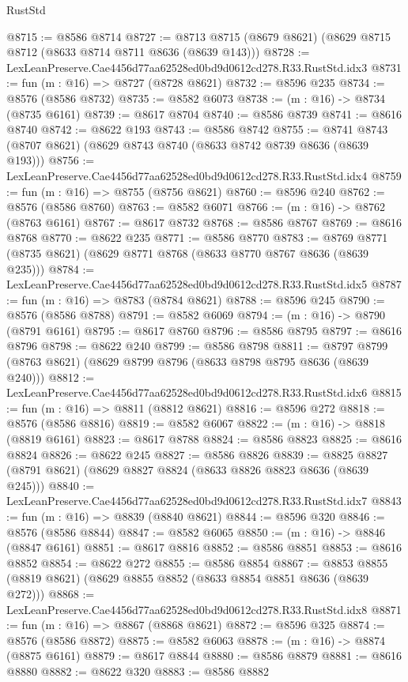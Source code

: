 \begin{lexlean}{RustStd}
\begin{coremodule}
@8715 := @8586 @8714
@8727 := @8713 @8715 (@8679 @8621) (@8629 @8715 @8712 (@8633 @8714 @8711 @8636 (@8639 @143)))
@8728 := LexLeanPreserve.Cae4456d77aa62528ed0bd9d0612cd278.R33.RustStd.idx3
@8731 := fun (m : @16) => @8727 (@8728 @8621)
@8732 := @8596 @235
@8734 := @8576 (@8586 @8732)
@8735 := @8582 @6073
@8738 := (m : @16) -> @8734 (@8735 @6161)
@8739 := @8617 @8704
@8740 := @8586 @8739
@8741 := @8616 @8740
@8742 := @8622 @193
@8743 := @8586 @8742
@8755 := @8741 @8743 (@8707 @8621) (@8629 @8743 @8740 (@8633 @8742 @8739 @8636 (@8639 @193)))
@8756 := LexLeanPreserve.Cae4456d77aa62528ed0bd9d0612cd278.R33.RustStd.idx4
@8759 := fun (m : @16) => @8755 (@8756 @8621)
@8760 := @8596 @240
@8762 := @8576 (@8586 @8760)
@8763 := @8582 @6071
@8766 := (m : @16) -> @8762 (@8763 @6161)
@8767 := @8617 @8732
@8768 := @8586 @8767
@8769 := @8616 @8768
@8770 := @8622 @235
@8771 := @8586 @8770
@8783 := @8769 @8771 (@8735 @8621) (@8629 @8771 @8768 (@8633 @8770 @8767 @8636 (@8639 @235)))
@8784 := LexLeanPreserve.Cae4456d77aa62528ed0bd9d0612cd278.R33.RustStd.idx5
@8787 := fun (m : @16) => @8783 (@8784 @8621)
@8788 := @8596 @245
@8790 := @8576 (@8586 @8788)
@8791 := @8582 @6069
@8794 := (m : @16) -> @8790 (@8791 @6161)
@8795 := @8617 @8760
@8796 := @8586 @8795
@8797 := @8616 @8796
@8798 := @8622 @240
@8799 := @8586 @8798
@8811 := @8797 @8799 (@8763 @8621) (@8629 @8799 @8796 (@8633 @8798 @8795 @8636 (@8639 @240)))
@8812 := LexLeanPreserve.Cae4456d77aa62528ed0bd9d0612cd278.R33.RustStd.idx6
@8815 := fun (m : @16) => @8811 (@8812 @8621)
@8816 := @8596 @272
@8818 := @8576 (@8586 @8816)
@8819 := @8582 @6067
@8822 := (m : @16) -> @8818 (@8819 @6161)
@8823 := @8617 @8788
@8824 := @8586 @8823
@8825 := @8616 @8824
@8826 := @8622 @245
@8827 := @8586 @8826
@8839 := @8825 @8827 (@8791 @8621) (@8629 @8827 @8824 (@8633 @8826 @8823 @8636 (@8639 @245)))
@8840 := LexLeanPreserve.Cae4456d77aa62528ed0bd9d0612cd278.R33.RustStd.idx7
@8843 := fun (m : @16) => @8839 (@8840 @8621)
@8844 := @8596 @320
@8846 := @8576 (@8586 @8844)
@8847 := @8582 @6065
@8850 := (m : @16) -> @8846 (@8847 @6161)
@8851 := @8617 @8816
@8852 := @8586 @8851
@8853 := @8616 @8852
@8854 := @8622 @272
@8855 := @8586 @8854
@8867 := @8853 @8855 (@8819 @8621) (@8629 @8855 @8852 (@8633 @8854 @8851 @8636 (@8639 @272)))
@8868 := LexLeanPreserve.Cae4456d77aa62528ed0bd9d0612cd278.R33.RustStd.idx8
@8871 := fun (m : @16) => @8867 (@8868 @8621)
@8872 := @8596 @325
@8874 := @8576 (@8586 @8872)
@8875 := @8582 @6063
@8878 := (m : @16) -> @8874 (@8875 @6161)
@8879 := @8617 @8844
@8880 := @8586 @8879
@8881 := @8616 @8880
@8882 := @8622 @320
@8883 := @8586 @8882

\end{coremodule}
\end{lexlean}
